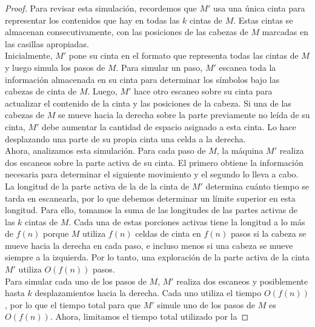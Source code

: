 \documentclass[letterpaper,10pt]{article}
\begin{document}
\begin{enumerate}
\begin{itemize}
\begin{proof}
             Para revisar esta simulación, recordemos que $M'$ usa una  
             única cinta para representar los contenidos que hay en todas las
             $k$ cintas de $M$. Estas cintas se almacenan consecutivamente,
             con las posiciones de las cabezas de $M$ marcadas en las casillas
             apropiadas. \\ 
             Inicialmente, $M'$ pone su cinta en el formato que representa
             todas las cintas de $M$ y luego simula los pasos de $M$. Para
             simular un paso, $M'$ escanea toda la información almacenada
             en su cinta para determinar los símbolos bajo las cabezas de cinta
             de $M$. Luego, $M'$ hace otro escaneo sobre su cinta para  
             actualizar el contenido de la cinta y las posiciones de la cabeza.
             Si una de las cabezas de $M$ se mueve hacia la derecha sobre la
             parte previamente no leída de su cinta, $M'$ debe aumentar la 
             cantidad de espacio asignado a esta cinta. Lo hace desplazando
             una parte de su propia cinta una celda a la derecha.\\
             Ahora, analizamos esta simulación. Para cada paso de $M$, la
             máquina $M'$ realiza dos escaneos sobre la parte activa de su
             cinta. El primero obtiene la información necesaria para determinar
             el siguiente movimiento y el segundo lo lleva a cabo. La longitud
             de la parte activa de la de la cinta de $M'$ determina cuánto
             tiempo se tarda en escanearla, por lo que debemos determinar
             un límite superior en esta longitud. Para ello, tomamos la suma de
             las longitudes de las partes activas de las $k$ cintas de $M$.
             Cada una de estas porciones activas tiene la longitud a lo más de
             $f(n)$ porque $M$ utiliza $f(n)$ celdas de cinta en $f(n)$ pasos
             si la cabeza se mueve hacia la derecha en cada paso, e incluso
             menos si una cabeza se mueve siempre a la izquierda. Por lo tanto,
             una exploración de la parte activa de la cinta $M'$ utiliza
             $O(f(n))$ pasos. \\
             Para simular cada uno de los pasos de $M$, $M'$ realiza dos
             escaneos y posiblemente hasta $k$ desplazamientos hacia
             la derecha. Cada uno utiliza el tiempo $O(f(n))$, por lo que el 
             tiempo total para que $M'$ simule uno de los pasos de $M$ es 
             $O(f(n))$. Ahora, limitamos el tiempo total utilizado por la

\end{proof}
\end{itemize}
\end{enumerate}
\end{document}
